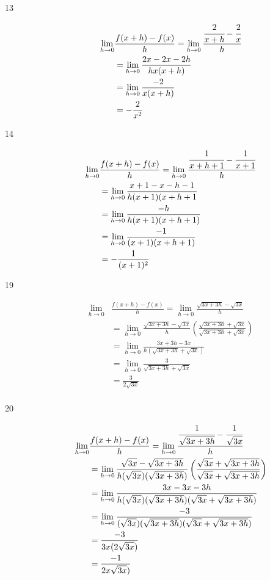 \documentclass{exam}
\begin{document}
\begin{description}
\item[13]
\begin{align*}
  \lim_{h \to 0} &\frac{f(x+h) - f(x)}{h} = \lim_{h \to 0} \frac{\cfrac{2}{x + h} - \cfrac{2}{x}}{h} \\
  &= \lim_{h \to 0} \frac{2x - 2x - 2h}{hx(x+h)} \\
  &= \lim_{h \to 0} \frac{-2}{x(x+h)} \\
  &= - \frac{2}{x^2} \\
\end{align*}

\item[14]
\begin{align*}
  \lim_{h \to 0} &\frac{f(x+h) - f(x)}{h} = \lim_{h \to 0} \frac{\cfrac{1}{x + h + 1} - \cfrac{1}{x + 1}}{h} \\
  &= \lim_{h \to 0} \frac{x + 1 - x - h - 1}{h(x+1)(x+h+1} \\
  &= \lim_{h \to 0} \frac{-h}{h(x+1)(x+h+1)} \\
  &= \lim_{h \to 0} \frac{-1}{(x+1)(x+h+1)} \\
  &= - \frac{1}{(x+1)^2} \\
\end{align*}

\item[19]
\begin{align*}
  \lim_{h \to 0} &\frac{f(x+h) - f(x)}{h} = \lim_{h \to 0} \frac{\sqrt{3x + 3h} - \sqrt{3x}}{h} \\
  &= \lim_{h \to 0} \frac{\sqrt{3x + 3h} - \sqrt{3x}}{h} \left( \frac{\sqrt{3x + 3h} + \sqrt{3x}}{\sqrt{3x + 3h} + \sqrt{3x}} \right) \\
  &= \lim_{h \to 0} \frac{3x + 3h - 3x}{h \left( \sqrt{3x + 3h} + \sqrt{3x} \right) } \\
  &= \lim_{h \to 0} \frac{3}{\sqrt{3x + 3h} + \sqrt{3x}} \\
  &= \frac{3}{2\sqrt{3x}} \\
\end{align*}

\item[20]
\begin{align*}
  \lim_{h \to 0} &\frac{f(x+h) - f(x)}{h} = \lim_{h \to 0} \frac{\cfrac{1}{\sqrt{3x + 3h}} - \cfrac{1}{\sqrt{3x}}}{h} \\
  &= \lim_{h \to 0} \frac{\sqrt{3x} - \sqrt{3x + 3h}}{h (\sqrt{3x})(\sqrt{3x + 3h})} \left( \frac{\sqrt{3x} + \sqrt{3x + 3h}}{\sqrt{3x} + \sqrt{3x + 3h}} \right) \\
  &= \lim_{h \to 0} \frac{3x - 3x - 3h}{h (\sqrt{3x})(\sqrt{3x + 3h})(\sqrt{3x} + \sqrt{3x + 3h})} \\
  &= \lim_{h \to 0} \frac{ -3}{(\sqrt{3x})(\sqrt{3x + 3h})(\sqrt{3x} + \sqrt{3x + 3h})} \\
  &= \frac{ -3}{3x(2\sqrt{3x})} \\
  &= \frac{ -1}{2x\sqrt{3x})} \\
\end{align*}


\end{description}
\end{document}
